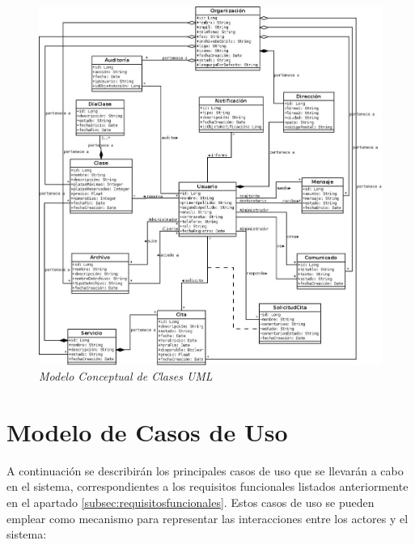 \begin{figure}
\centering
  \includegraphics[scale=.35]{img/modelo-conceptual.jpeg}
  \caption{\textit{\textit{Modelo Conceptual de Clases UML}}}
  \label{fig:modelo-conceptual}
\end{figure}


\section{Modelo de Casos de Uso}

A continuación se describirán los principales casos de uso que se llevarán a cabo en el sistema, correspondientes a los requisitos funcionales listados anteriormente en el apartado \ref{subsec:requisitosfuncionales}. Estos casos de uso se pueden emplear como mecanismo para representar las interacciones entre los actores y el sistema:


